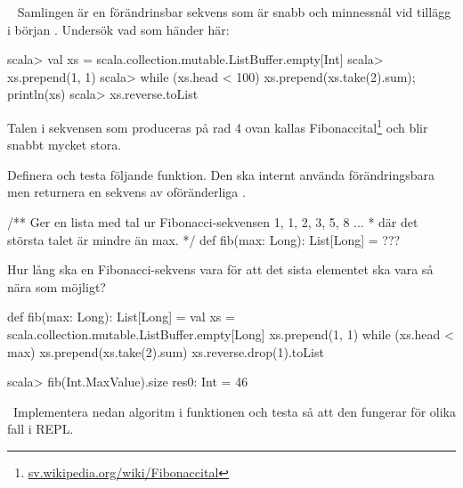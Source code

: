 \QUESTEND




\QUESTBEGIN

\Task  \what~ Samlingen  är en förändrinsbar sekvens som är snabb och minnessnål vid tillägg i början . Undersök vad som händer här:
\begin{REPL}
scala> val xs = scala.collection.mutable.ListBuffer.empty[Int]
scala> xs.prepend(1, 1)
scala> while (xs.head < 100) {xs.prepend(xs.take(2).sum); println(xs)}
scala> xs.reverse.toList
\end{REPL}
Talen i sekvensen som produceras på rad 4 ovan kallas Fibonaccital\footnote{\href{https://sv.wikipedia.org/wiki/Fibonaccital}{sv.wikipedia.org/wiki/Fibonaccital}} och blir snabbt mycket stora.

\Subtask Definera och testa följande funktion. Den ska internt använda förändringsbara  men returnera en sekvens av oföränderliga .

\begin{Code}
/** Ger en lista med tal ur Fibonacci-sekvensen 1, 1, 2, 3, 5, 8 ...
  * där det största talet är mindre än max. */
def fib(max: Long): List[Long]  = ???
\end{Code}


\Subtask
Hur lång ska en Fibonacci-sekvens vara för att det sista elementet ska vara så nära  som möjligt?

\SOLUTION


\TaskSolved \what


\SubtaskSolved

\begin{Code}
def fib(max: Long): List[Long] = {
  val xs = scala.collection.mutable.ListBuffer.empty[Long]
  xs.prepend(1, 1)
  while (xs.head < max) xs.prepend(xs.take(2).sum)
  xs.reverse.drop(1).toList
}

\end{Code}

\SubtaskSolved

\begin{REPL}
scala> fib(Int.MaxValue).size
res0: Int = 46
\end{REPL}

\QUESTEND




\QUESTBEGIN

\Task \what~Implementera nedan algoritm i funktionen  och testa så att den fungerar för olika fall i REPL.


